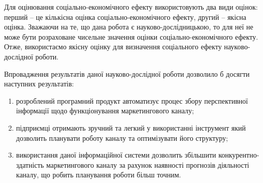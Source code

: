 Для оцінювання соціально-економічного ефекту використовують два види оцінок: перший – це кількісна оцінка соціально-економічного ефекту, другий – якісна оцінка. Зважаючи на те, що дана робота є науково-дослідницькою, то для неї не може бути розраховане чисельне значення оцінки соціально-економічного ефекту. Отже, використаємо якісну оцінку для визначення соціального ефекту науково-дослідної роботи.

Впровадження результатів даної науково-дослідної роботи дозволило б досягти наступних результатів:
\begin{enumerate}
\item розроблений програмний продукт автоматизує процес збору перспективної інформації щодо функціонування маркетингового каналу;
\item підприємці отримають зручний та легкий у використанні інструмент який дозволить планувати роботу каналу та оптимізувати його структуру;
\item використання даної інформаційної системи дозволить збільшити конкурентно-здатність маркетингового каналу за рахунок наявності прогнозів діяльності каналу, що робить планування роботи більш точним.
\end{enumerate}
